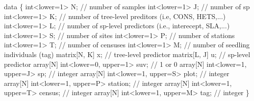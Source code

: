 \documentclass[
  12pt,
  letterpaper,
  DIV=11,
  numbers=noendperiod]{scrartcl}
\newenvironment{Shaded}{\begin{snugshade}}{\end{snugshade}}
\newcommand{\CommentTok}[1]{\textcolor[rgb]{0.37,0.37,0.37}{#1}}
\newcommand{\DataTypeTok}[1]{\textcolor[rgb]{0.68,0.00,0.00}{#1}}
\newcommand{\DecValTok}[1]{\textcolor[rgb]{0.68,0.00,0.00}{#1}}
\newcommand{\KeywordTok}[1]{\textcolor[rgb]{0.00,0.23,0.31}{#1}}
\newcommand{\NormalTok}[1]{\textcolor[rgb]{0.00,0.23,0.31}{#1}}
\begin{document}
\begin{Shaded}
\begin{Highlighting}[]
\KeywordTok{data}\NormalTok{ \{}
  \DataTypeTok{int}\NormalTok{\textless{}}\KeywordTok{lower}\NormalTok{=}\DecValTok{1}\NormalTok{\textgreater{} N; }\CommentTok{// number of samples}
  \DataTypeTok{int}\NormalTok{\textless{}}\KeywordTok{lower}\NormalTok{=}\DecValTok{1}\NormalTok{\textgreater{} J; }\CommentTok{// number of sp}
  \DataTypeTok{int}\NormalTok{\textless{}}\KeywordTok{lower}\NormalTok{=}\DecValTok{1}\NormalTok{\textgreater{} K; }\CommentTok{// number of tree{-}level preditors (i.e, CONS, HETS,...)}
  \DataTypeTok{int}\NormalTok{\textless{}}\KeywordTok{lower}\NormalTok{=}\DecValTok{1}\NormalTok{\textgreater{} L; }\CommentTok{// number of sp{-}level predictors (i.e., interecept, SLA,...)}
  \DataTypeTok{int}\NormalTok{\textless{}}\KeywordTok{lower}\NormalTok{=}\DecValTok{1}\NormalTok{\textgreater{} S; }\CommentTok{// number of sites}
  \DataTypeTok{int}\NormalTok{\textless{}}\KeywordTok{lower}\NormalTok{=}\DecValTok{1}\NormalTok{\textgreater{} P; }\CommentTok{// number of stations}
  \DataTypeTok{int}\NormalTok{\textless{}}\KeywordTok{lower}\NormalTok{=}\DecValTok{1}\NormalTok{\textgreater{} T; }\CommentTok{// number of censuses}
  \DataTypeTok{int}\NormalTok{\textless{}}\KeywordTok{lower}\NormalTok{=}\DecValTok{1}\NormalTok{\textgreater{} M; }\CommentTok{// number of seedling individuals (tag)}
  \DataTypeTok{matrix}\NormalTok{[N, K] x; }\CommentTok{// tree{-}level predictor}
  \DataTypeTok{matrix}\NormalTok{[L, J] u; }\CommentTok{// sp{-}level predictor}
  \DataTypeTok{array}\NormalTok{[N] }\DataTypeTok{int}\NormalTok{\textless{}}\KeywordTok{lower}\NormalTok{=}\DecValTok{0}\NormalTok{, }\KeywordTok{upper}\NormalTok{=}\DecValTok{1}\NormalTok{\textgreater{} suv; }\CommentTok{// 1 or 0}
  \DataTypeTok{array}\NormalTok{[N] }\DataTypeTok{int}\NormalTok{\textless{}}\KeywordTok{lower}\NormalTok{=}\DecValTok{1}\NormalTok{, }\KeywordTok{upper}\NormalTok{=J\textgreater{} sp; }\CommentTok{// integer}
  \DataTypeTok{array}\NormalTok{[N] }\DataTypeTok{int}\NormalTok{\textless{}}\KeywordTok{lower}\NormalTok{=}\DecValTok{1}\NormalTok{, }\KeywordTok{upper}\NormalTok{=S\textgreater{} plot; }\CommentTok{// integer}
  \DataTypeTok{array}\NormalTok{[N] }\DataTypeTok{int}\NormalTok{\textless{}}\KeywordTok{lower}\NormalTok{=}\DecValTok{1}\NormalTok{, }\KeywordTok{upper}\NormalTok{=P\textgreater{} station; }\CommentTok{// integer}
  \DataTypeTok{array}\NormalTok{[N] }\DataTypeTok{int}\NormalTok{\textless{}}\KeywordTok{lower}\NormalTok{=}\DecValTok{1}\NormalTok{, }\KeywordTok{upper}\NormalTok{=T\textgreater{} census; }\CommentTok{// integer}
  \DataTypeTok{array}\NormalTok{[N] }\DataTypeTok{int}\NormalTok{\textless{}}\KeywordTok{lower}\NormalTok{=}\DecValTok{1}\NormalTok{, }\KeywordTok{upper}\NormalTok{=M\textgreater{} tag; }\CommentTok{// integer}
\NormalTok{\}}


\end{Highlighting}
\end{Shaded}
\end{document}
